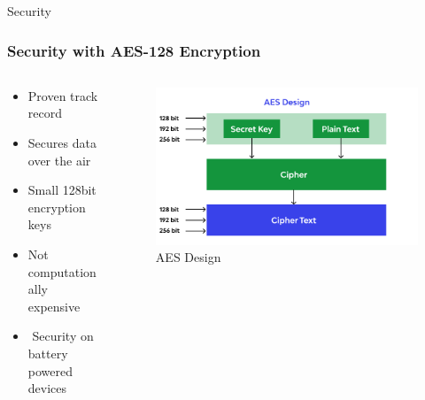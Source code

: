\documentclass{beamer}
\begin{document}
\begin{frame}{Security}
  \frametitle{Security with AES-128 Encryption}
  \begin{columns}
    \begin{column}{0.5\textwidth}
      \begin{itemize}
        \item Proven track record
        \item Secures data over the air
        \item Small 128bit encryption keys
        \item Not computationally expensive
        \item \faThumbsOUp$ $ Security on battery powered devices
      \end{itemize}
    \end{column}
    \begin{column}{0.5\textwidth}
      \begin{figure}[htbp]
        \centering
        \includegraphics[width=\textwidth]{images/AES128_structure.png}
        \caption{AES Design \cite{Beschokov}}
        \label{fig:AES_Design}
      \end{figure}
    \end{column}
  \end{columns}
\end{frame}
\end{document}
